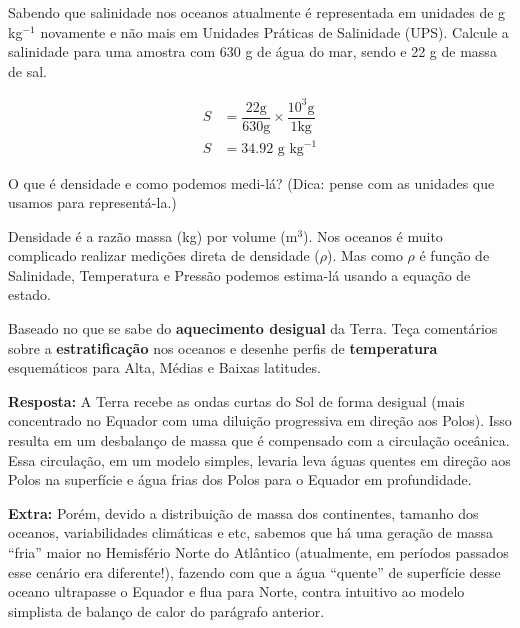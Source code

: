 \documentclass[letterpaper,portuguese,12pt,pdftex]{exam}
\begin{document}
\begin{questions}
\question[2\half]
Sabendo que salinidade nos oceanos atualmente é representada em unidades de
g kg$^{-1}$ novamente e não mais em Unidades Práticas de Salinidade (UPS).
Calcule a salinidade para uma amostra com 630 g de água do mar, sendo e 22 g
de massa de sal.

\begin{solution}
  \begin{align*}
    S &= \dfrac{22 \text{g}}{630 \text{g}} \times \dfrac{10^{3} \text{g}}{1 \text{kg}} \\
    S &= 34.92 \text{ g kg}^{-1}
  \end{align*}
\end{solution}

\question[2]
O que é densidade e como podemos medi-lá? (Dica: pense com as unidades que
usamos para representá-la.)

\begin{solution}
  Densidade é a razão massa (kg) por volume (m$^3$).  Nos oceanos é muito
  complicado realizar medições direta de densidade ($\rho$).  Mas como $\rho$ é
  função de Salinidade, Temperatura e Pressão podemos estima-lá usando a equação
  de estado.
\end{solution}

\question[3]
Baseado no que se sabe do {\bf aquecimento desigual} da Terra.  Teça comentários
sobre a {\bf estratificação} nos oceanos e desenhe perfis de {\bf temperatura}
esquemáticos para Alta, Médias e Baixas latitudes.

\begin{solution}
  {\bf Resposta:} A Terra recebe as ondas curtas do Sol de forma desigual (mais
  concentrado no Equador com uma diluição progressiva em direção aos Polos).
  Isso resulta em um desbalanço de massa que é compensado com a circulação
  oceânica.  Essa circulação, em um modelo simples, levaria leva águas quentes
  em direção aos Polos na superfície e água frias dos Polos para o Equador em
  profundidade.

  {\bf Extra:} Porém, devido a distribuição de massa dos continentes, tamanho
  dos oceanos, variabilidades climáticas e etc, sabemos que há uma geração de
  massa ``fria'' maior no Hemisfério Norte do Atlântico (atualmente, em períodos
  passados esse cenário era diferente!), fazendo com que a água ``quente'' de
  superfície desse oceano ultrapasse o Equador e flua para Norte, contra
  intuitivo ao modelo simplista de balanço de calor do parágrafo anterior.
\end{solution}



\end{questions}
\end{document}
